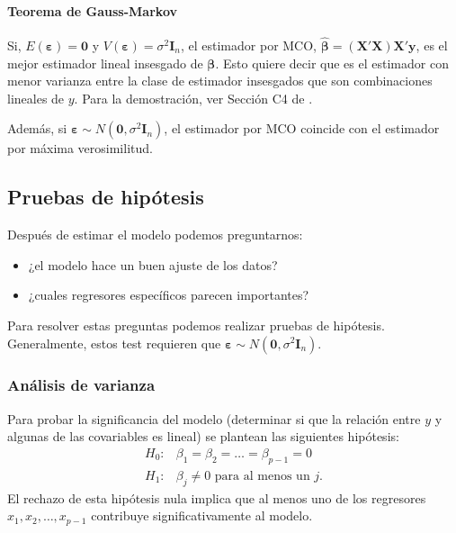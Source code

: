 \documentclass[
]{article}
\providecommand{\tightlist}{%
  \setlength{\itemsep}{0pt}\setlength{\parskip}{0pt}}
\begin{document}
\hypertarget{teorema-de-gauss-markov}{%
\paragraph*{Teorema de Gauss-Markov}\label{teorema-de-gauss-markov}}

Si, \(E(\boldsymbol \varepsilon) = \boldsymbol 0\) y \(V(\boldsymbol \varepsilon) = \sigma^{2}\boldsymbol I_{n}\), el estimador por MCO, \(\widehat{\boldsymbol \beta}= (\boldsymbol X'\boldsymbol X)\boldsymbol X'\boldsymbol y\), es el mejor estimador lineal insesgado de \(\boldsymbol \beta\). Esto quiere decir que es el estimador con menor varianza entre la clase de estimador insesgados que son combinaciones lineales de \(y\). Para la demostración, ver Sección C4 de \citet{montgomery_introduction_2012}.

Además, si \(\boldsymbol \varepsilon\sim N(\boldsymbol 0, \sigma^{2}\boldsymbol I_{n})\), el estimador por MCO coincide con el estimador por máxima verosimilitud.

\hypertarget{pruebas-de-hipuxf3tesis-1}{%
\subsection{Pruebas de hipótesis}\label{pruebas-de-hipuxf3tesis-1}}

Después de estimar el modelo podemos preguntarnos:

\begin{itemize}
\tightlist
\item
  ¿el modelo hace un buen ajuste de los datos?
\item
  ¿cuales regresores específicos parecen importantes?
\end{itemize}

Para resolver estas preguntas podemos realizar pruebas de hipótesis. Generalmente, estos test requieren que \(\boldsymbol \varepsilon\sim N(\boldsymbol 0,\sigma^{2}\boldsymbol I_{n})\).

\hypertarget{anuxe1lisis-de-varianza-1}{%
\subsubsection{Análisis de varianza}\label{anuxe1lisis-de-varianza-1}}

Para probar la significancia del modelo (determinar si que la relación entre \(y\) y algunas de las covariables es lineal) se plantean las siguientes hipótesis:
\begin{equation}
\begin{split}
H_{0}:& \beta_{1}=\beta_{2}=\ldots=\beta_{p-1} = 0 \\
H_{1}:& \beta_{j}\neq 0 \mbox{ para al menos un }j.
\end{split}
\label{eq:HANOVA}
\end{equation}
El rechazo de esta hipótesis nula implica que al menos uno de los regresores \(x_1, x_2,\ldots , x_{p-1}\) contribuye significativamente al modelo.
\end{document}
